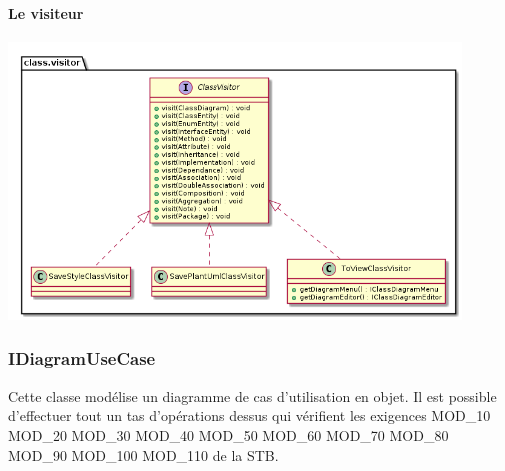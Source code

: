\documentclass[a4paper,10pt]{article}
\begin{document}
	\paragraph{Le visiteur}
	\begin{center}
	  \includegraphics[width=12cm]{Image/classVisiteur.png}
	\end{center}
	
      \subsubsection{IDiagramUseCase}
	Cette classe modélise un diagramme de cas d'utilisation en objet. Il est possible d'effectuer tout un tas d'opérations dessus qui vérifient les exigences 
	MOD\_10 MOD\_20 MOD\_30 MOD\_40 MOD\_50 MOD\_60 MOD\_70 MOD\_80 MOD\_90 MOD\_100 MOD\_110 de la STB.
	
	\newpage
\end{document}
